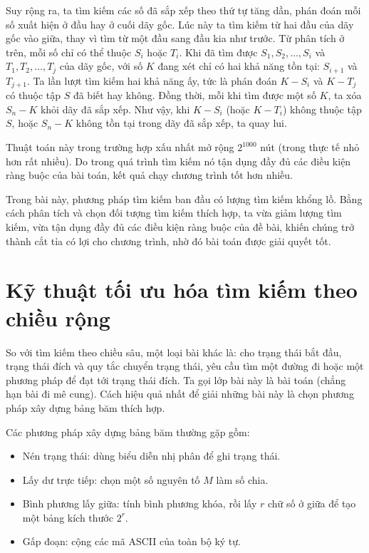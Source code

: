 \documentclass[11pt]{article}
\begin{document}
Suy rộng ra, ta tìm kiếm các số đã sắp xếp theo thứ tự tăng dần, phán đoán mỗi
số xuất hiện ở đầu hay ở cuối dãy gốc. Lúc này ta tìm kiếm từ hai đầu của dãy
gốc vào giữa, thay vì tìm từ một đầu sang đầu kia như trước. Từ phân tích ở
trên, mỗi số chỉ có thể thuộc \(S_i\) hoặc \(T_i\). Khi đã tìm được
\(S_1,S_2,\ldots,S_i\) và \(T_1,T_2,\ldots,T_j\) của dãy gốc, với số \(K\)
đang xét chỉ có hai khả năng tồn tại: \(S_{i+1}\) và \(T_{j+1}\). Ta lần lượt
tìm kiếm hai khả năng ấy, tức là phán đoán \(K-S_i\) và \(K-T_j\) có thuộc tập
\(S\) đã biết hay không. Đồng thời, mỗi khi tìm được một số \(K\), ta xóa
\(S_n-K\) khỏi dãy đã sắp xếp. Như vậy, khi \(K-S_i\) (hoặc \(K-T_i\)) không
thuộc tập \(S\), hoặc \(S_n-K\) không tồn tại trong dãy đã sắp xếp, ta quay
lui.

Thuật toán này trong trường hợp xấu nhất mở rộng \(2^{1000}\) nút (trong thực
tế nhỏ hơn rất nhiều). Do trong quá trình tìm kiếm nó tận dụng đầy đủ các
điều kiện ràng buộc của bài toán, kết quả chạy chương trình tốt hơn nhiều.

Trong bài này, phương pháp tìm kiếm ban đầu có lượng tìm kiếm khổng lồ. Bằng
cách phân tích và chọn đối tượng tìm kiếm thích hợp, ta vừa giảm lượng tìm
kiếm, vừa tận dụng đầy đủ các điều kiện ràng buộc của đề bài, khiến chúng trở
thành cắt tỉa có lợi cho chương trình, nhờ đó bài toán được giải quyết tốt.

\section{Kỹ thuật tối ưu hóa tìm kiếm theo chiều rộng}

So với tìm kiếm theo chiều sâu, một loại bài khác là: cho trạng thái bắt đầu,
trạng thái đích và quy tắc chuyển trạng thái, yêu cầu tìm một đường đi hoặc
một phương pháp để đạt tới trạng thái đích. Ta gọi lớp bài này là bài toán
 (chẳng hạn bài đi mê cung). Cách hiệu quả nhất để giải những
bài này là chọn phương pháp xây dựng bảng băm thích hợp.

Các phương pháp xây dựng bảng băm thường gặp gồm:
\begin{itemize}
  \item Nén trạng thái: dùng biểu diễn nhị phân để ghi trạng thái.
  \item Lấy dư trực tiếp: chọn một số nguyên tố \(M\) làm số chia.
  \item Bình phương lấy giữa: tính bình phương khóa, rồi lấy \(r\) chữ số ở
  giữa để tạo một bảng kích thước \(2^r\).
  \item Gấp đoạn: cộng các mã ASCII của toàn bộ ký tự.
\end{itemize}
\end{document}
